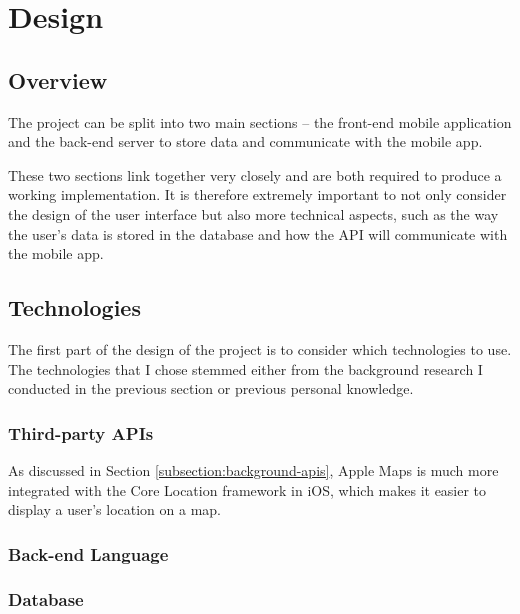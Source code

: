 \chapter{Design}

\section{Overview}

The project can be split into two main sections -- the front-end mobile application and the back-end server to store data and communicate with the mobile app.

These two sections link together very closely and are both required to produce a working implementation. It is therefore extremely important to not only consider the design of the user interface but also more technical aspects, such as the way the user's data is stored in the database and how the API will communicate with the mobile app.

\section{Technologies}

The first part of the design of the project is to consider which technologies to use. The technologies that I chose stemmed either from the background research I conducted in the previous section or previous personal knowledge.



\subsection{Third-party APIs}

As discussed in Section \ref{subsection:background-apis}, Apple Maps is much more integrated with the Core Location framework in iOS, which makes it easier to display a user's location on a map.


\subsection{Back-end Language}

\subsection{Database}

